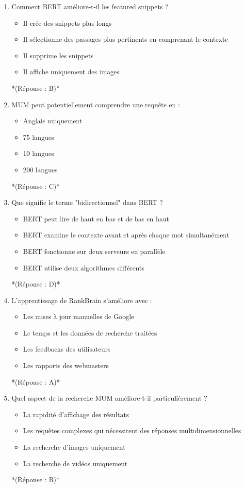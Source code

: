 \documentclass[12pt,a4paper,twoside]{report}
\begin{document}
\begin{enumerate}
\item Comment BERT améliore-t-il les featured snippets ?
\begin{itemize}
\item[A)] Il crée des snippets plus longs
\item[B)] Il sélectionne des passages plus pertinents en comprenant le contexte
\item[C)] Il supprime les snippets
\item[D)] Il affiche uniquement des images
\end{itemize}
*(Réponse : B)*

\item MUM peut potentiellement comprendre une requête en :
\begin{itemize}
\item[A)] Anglais uniquement
\item[B)] 75 langues
\item[C)] 10 langues
\item[D)] 200 langues
\end{itemize}
*(Réponse : C)*

\item Que signifie le terme "bidirectionnel" dans BERT ?
\begin{itemize}
\item[A)] BERT peut lire de haut en bas et de bas en haut
\item[B)] BERT examine le contexte avant et après chaque mot simultanément
\item[C)] BERT fonctionne sur deux serveurs en parallèle
\item[D)] BERT utilise deux algorithmes différents
\end{itemize}
*(Réponse : D)*

\item L'apprentissage de RankBrain s'améliore avec :
\begin{itemize}
\item[A)] Les mises à jour manuelles de Google
\item[B)] Le temps et les données de recherche traitées
\item[C)] Les feedbacks des utilisateurs
\item[D)] Les rapports des webmasters
\end{itemize}
*(Réponse : A)*

\item Quel aspect de la recherche MUM améliore-t-il particulièrement ?
\begin{itemize}
\item[A)] La rapidité d'affichage des résultats
\item[B)] Les requêtes complexes qui nécessitent des réponses multidimensionnelles
\item[C)] La recherche d'images uniquement
\item[D)] La recherche de vidéos uniquement
\end{itemize}
*(Réponse : B)*


\end{enumerate}
\end{document}
